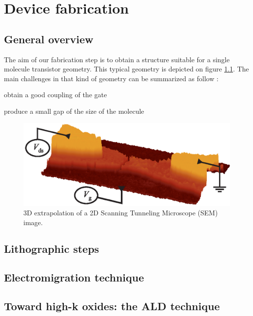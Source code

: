 \chapter{Device fabrication}

\section{General overview}


The aim of our fabrication step is to obtain a structure suitable for a single molecule transistor geometry. This typical geometry is depicted on figure \ref{fig:SMT_picture}. The main challenges in that kind of geometry can be summarized as follow :

\begin{list}
  \item obtain a good coupling of the gate 
  \item produce a small gap of the size of the molecule
\end{list}

\begin{figure}[h]
  \begin{center}
    \includegraphics[width = 12cm]{fabrication_chapter/figs/SMT.eps}
  \end{center}
  \caption{3D extrapolation of a 2D Scanning Tunneling Microscope (SEM) image.}
  \label{fig:SMT_picture}
\end{figure}

\section{Lithographic steps}
\section{Electromigration technique}
\section{Toward high-k oxides: the ALD technique}

